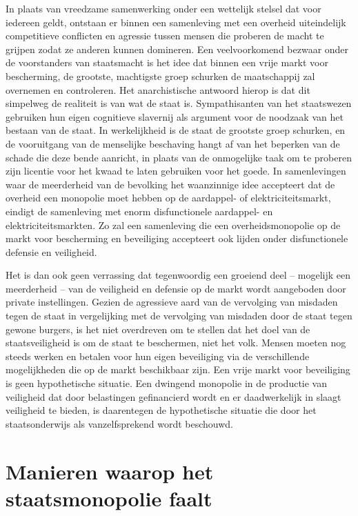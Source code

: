 In plaats van vreedzame samenwerking onder een wettelijk stelsel dat voor iedereen geldt, ontstaan er binnen een samenleving met een overheid uiteindelijk competitieve conflicten en agressie tussen mensen die proberen de macht te grijpen zodat ze anderen kunnen domineren. Een veelvoorkomend bezwaar onder de voorstanders van staatsmacht is het idee dat binnen een vrije markt voor bescherming, de grootste, machtigste groep schurken de maatschappij zal overnemen en controleren. Het anarchistische antwoord hierop is dat dit simpelweg de realiteit is van wat de staat is. Sympathisanten van het staatswezen gebruiken hun eigen cognitieve slavernij als argument voor de noodzaak van het bestaan van de staat. In werkelijkheid is de staat de grootste groep schurken, en de vooruitgang van de menselijke beschaving hangt af van het beperken van de schade die deze bende aanricht, in plaats van de onmogelijke taak om te proberen zijn licentie voor het kwaad te laten gebruiken voor het goede. In samenlevingen waar de meerderheid van de bevolking het waanzinnige idee accepteert dat de overheid een monopolie moet hebben op de aardappel- of elektriciteitsmarkt, eindigt de samenleving met enorm disfunctionele aardappel- en elektriciteitsmarkten. Zo zal een samenleving die een overheidsmonopolie op de markt voor bescherming en beveiliging accepteert ook lijden onder disfunctionele defensie en veiligheid.

Het is dan ook geen verrassing dat tegenwoordig een groeiend deel -- mogelijk een meerderheid -- van de veiligheid en defensie op de markt wordt aangeboden door private instellingen. Gezien de agressieve aard van de vervolging van misdaden tegen de staat in vergelijking met de vervolging van misdaden door de staat tegen gewone burgers, is het niet overdreven om te stellen dat het doel van de staatsveiligheid is om de staat te beschermen, niet het volk. Mensen moeten nog steeds werken en betalen voor hun eigen beveiliging via de verschillende mogelijkheden die op de markt beschikbaar zijn. Een vrije markt voor beveiliging is geen hypothetische situatie. Een dwingend monopolie in de productie van veiligheid dat door belastingen gefinancierd wordt en er daadwerkelijk in slaagt veiligheid te bieden, is daarentegen de hypothetische situatie die door het staatsonderwijs als vanzelfsprekend wordt beschouwd.

\hypertarget{manieren-waarop-het-staatsmonopolie-faalt}{%
\section{Manieren waarop het staatsmonopolie faalt}\label{manieren-waarop-het-staatsmonopolie-faalt}}

